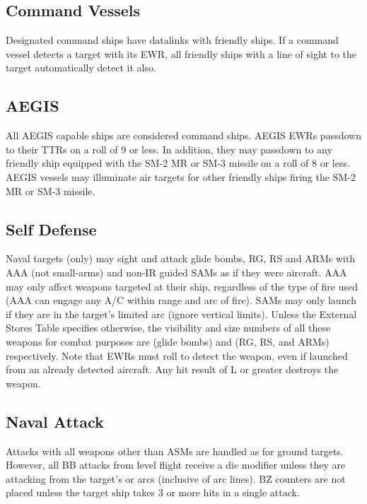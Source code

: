 \subsection{Command Vessels}

Designated command ships have data\-links with friendly ships. If a command vessel detects a target with its EWR, all friendly ships with a line of sight to the target automatically detect it also.

\subsection{AEGIS}

All AEGIS capable ships are considered command ships.   AEGIS EWRs passdown to their TTRs on a roll of 9 or less.  In addition, they may passdown to any friendly ship equipped with the SM-2 MR or SM-3 missile on a roll of 8 or less.  AEGIS vessels may illuminate air targets for other friendly ships firing the SM-2 MR or SM-3 missile.

\subsection{Self Defense}  Naval targets (only) may sight and attack glide bombs, RG, RS and ARMs with AAA (not small-arms) and non-IR guided SAMs as if they were aircraft.  AAA may only affect weapons targeted at their ship, regardless of the type of fire used (AAA can engage any A/C within range and arc of fire).  SAMs may only launch if they are in the target's limited arc (ignore vertical limits).  Unless the External Stores Table specifies otherwise, the visibility and size numbers of all these weapons for combat purposes are  (glide bombs) and  (RG, RS, and ARMs) respectively.  Note that EWRs must roll to detect the weapon, even if launched from an already detected aircraft.  Any hit result of L or greater destroys the weapon.

\subsection{Naval Attack} Attacks with all weapons other than ASMs are handled as for ground targets.  However, all BB attacks from level flight receive a  die modifier unless they are attacking from the target's  or  arcs (inclusive of arc lines).  BZ counters are not placed unless the target ship takes 3 or more hits in a single attack.

